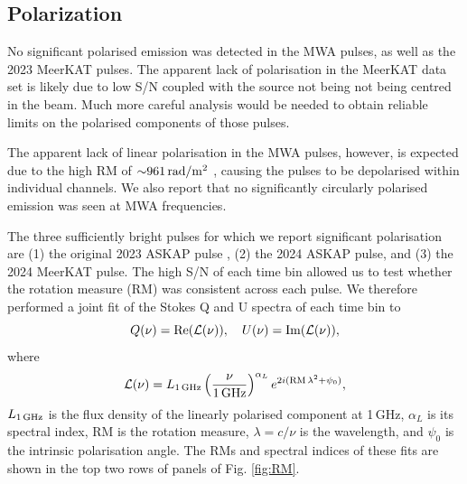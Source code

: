 \documentclass[fleqn,usenatbib]{mnras}
\begin{document}

\subsection{Polarization} \label{sec:polarization}

No significant polarised emission was detected in the MWA pulses, as well as the 2023 MeerKAT pulses.
The apparent lack of polarisation in the MeerKAT data set is likely due to low S/N coupled with the source not being not being centred in the beam.
Much more careful analysis would be needed to obtain reliable limits on the polarised components of those pulses.

The apparent lack of linear polarisation in the MWA pulses, however, is expected due to the high RM of ${\sim}961\,{\rm rad}/{\rm m}^2$ , causing the pulses to be depolarised within individual channels.
We also report that no significantly circularly polarised emission was seen at MWA frequencies.

The three sufficiently bright pulses for which we report significant polarisation are (1) the original 2023 ASKAP pulse , (2) the 2024 ASKAP pulse, and (3) the 2024 MeerKAT pulse.
The high S/N of each time bin allowed us to test whether the rotation measure (RM) was consistent across each pulse.
We therefore performed a joint fit of the Stokes Q and U spectra of each time bin to
\begin{equation}
    Q(\nu) = {\rm Re}(\mathcal{L}(\nu)),
    \quad
    U(\nu) = {\rm Im}(\mathcal{L}(\nu)),
    \label{eqn:RM}
\end{equation}
where
\begin{equation}
    \mathcal{L}(\nu)
        = L_{\rm 1\,GHz}\left(\frac{\nu}{\rm 1\,GHz}\right)^{\alpha_L} e^{2i({\rm RM}\,\lambda^2 + \psi_0)},
\end{equation}
$L_{\rm 1\,GHz}$ is the flux density of the linearly polarised component at 1\,GHz, $\alpha_L$ is its spectral index, RM is the rotation measure, $\lambda = c/\nu$ is the wavelength, and $\psi_0$ is the intrinsic polarisation angle.
The RMs and spectral indices of these fits are shown in the top two rows of panels of Fig. \ref{fig:RM}.
\end{document}
